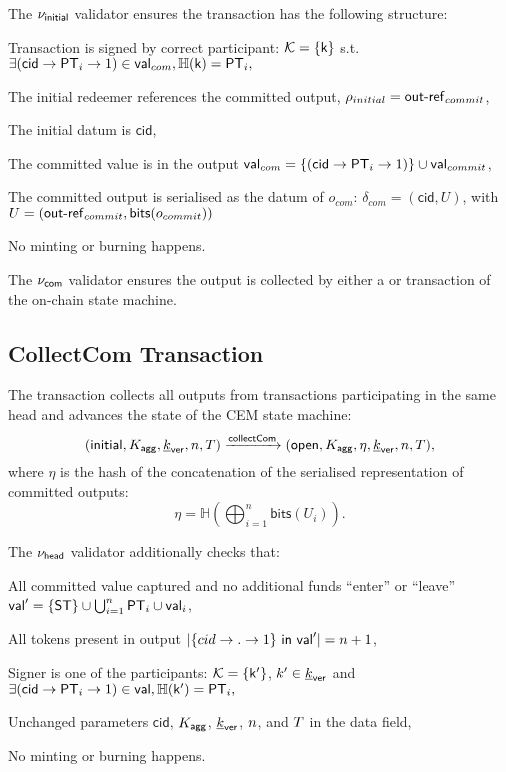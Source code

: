 \noindent The $\nu_\mathsf{initial}$ validator ensures the transaction has the following structure:
\begin{menumerate}
    \item Transaction is signed by correct participant: $\mathcal K = \{\mathsf{k}\}$ s.t.
    $
    \exists (\mathsf{cid} \rightarrow \mathsf{PT}_i \rightarrow 1) \in \mathsf{val}_{com}, \mathbb{H}(\mathsf{k}) = \mathsf{PT}_i,
    $
    \item The initial redeemer references the committed output, $\rho_{initial} = \mathsf{out\textsf{-}{}ref}_{commit}$,
    \item The initial datum is $\mathsf{cid}$,
    \item The committed value is in the output $\mathsf{val}_{com} = \{(\mathsf{cid} \rightarrow \mathsf{PT}_i \rightarrow 1)\} \cup \mathsf{val}_{commit} $,
    \item The committed output is serialised as the datum of $o_{com}$: $\delta_{com} = (\mathsf{cid}, U)$, with \\ $U = (\mathsf{out\textsf{-}{}ref}_{commit},\mathsf{bits}(o_{commit}))$
    \item No minting or burning happens.
\end{menumerate}

\noindent The $\nu_\mathsf{com}$ validator ensures the output is collected by either a \mtxCCom{} or \mtxAbort{} transaction of the on-chain state machine.

\subsection{CollectCom Transaction}



The \mtxCCom{} transaction collects all outputs from \mtxCom{} transactions participating in the same head and advances the state of the CEM state machine:
$$
   (\mathsf{initial},K_{\mathsf{agg}},\underline{k}_{\mathsf{ver}},n,T) \xrightarrow{\mathsf{collectCom}} (\mathsf{open},K_{\mathsf{agg}},\eta,\underline{k}_{\mathsf{ver}},n,T),
$$
where $\eta$ is the hash of the concatenation of the serialised representation of committed outputs:
$$
\eta = \mathbb{H}(\bigoplus_{i=1}^n \mathsf{bits}(U_i)).
$$

\noindent The $\nu_\mathsf{head}$ validator additionally checks that:
\begin{menumerate}
  \item All committed value captured and no additional funds ``enter'' or ``leave''
  $\mathsf{val}' = \{\mathsf{ST}\} \cup \bigcup_{i=1}^{n} \mathsf{PT}_{i} \cup \mathsf{val}_{i}$,
  \item All tokens present in output
  $|\{cid \rightarrow . \rightarrow 1\} ~ \mathsf{in} ~ \mathsf{val}'| = n + 1$,
  \item Signer is one of the participants: $\mathcal K = \{\mathsf{k'}\}$, $k' \in \underline{k}_{\mathsf{ver}}$ and
    $
    \exists (\mathsf{cid} \rightarrow \mathsf{PT}_i \rightarrow 1) \in \mathsf{val}, \mathbb{H}(\mathsf{k'}) = \mathsf{PT}_i,
    $
  \item Unchanged parameters $\mathsf{cid}$, $K_{\mathsf{agg}}$, $\underline{k}_{\mathsf{ver}}$, $n$, and
  $T$ in the data field,
  \item No minting or burning happens.
\end{menumerate}

